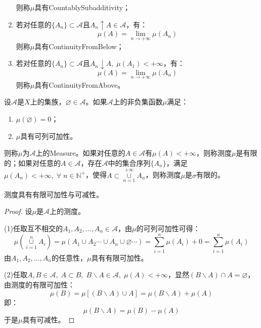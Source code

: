 \begin{definition}
\begin{enumerate}
\begin{equation*}
		\end{equation*}
		则称$\mu$具有\gls{CountablySubadditivity}；
		\item 若对任意的$\{A_n\}\subset\mathscr{A}$且$A_n\uparrow A\in\mathscr{A}$，有：
		\begin{equation*}
			\mu\left(A\right)=\lim_{n\to+\infty}\mu(A_n)
		\end{equation*}
		则称$\mu$具有\gls{ContinuityFromBelow}；
		\item 若对任意的$\{A_n\}\subset\mathscr{A}$且$A_n\downarrow A,\;\mu(A_1)<+\infty$，有：
		\begin{equation*}
			\mu\left(A\right)=\lim_{n\to+\infty}\mu(A_n)
		\end{equation*}
		则称$\mu$具有\gls{ContinuityFromAbove}。
	\end{enumerate}
\end{definition}
\begin{definition}
	设$\mathscr{A}$是$X$上的集族，$\varnothing\in\mathscr{A}$。如果$\mathscr{A}$上的非负集函数$\mu$满足：
	\begin{enumerate}
		\item $\mu(\varnothing)=0$；
		\item $\mu$具有可列可加性。
	\end{enumerate}
	则称$\mu$为$\mathscr{A}$上的\gls{Measure}。如果对任意的$A\in\mathscr{A}$有$\mu(A)<+\infty$，则称测度$\mu$是有限的；如果对任意的$A\in\mathscr{A}$，存在$\mathscr{A}$中的集合序列$\{A_n\}$，满足$\mu(A_n)<+\infty,\;\forall\;n\in\mathbb{N}^+$，使得$A\subset\underset{n=1}{\overset{+\infty}{\cup}}A_n$，则称测度$\mu$是$\sigma$有限的。
\end{definition}
\begin{theorem}\label{theo:MeasureFiniteAdditivityReducibility}
	测度具有有限可加性与可减性。
\end{theorem}
\begin{proof}
	设$\mu$是$\mathscr{A}$上的测度。\par
	(1)任取互不相交的$A_1,A_2,\dots,A_n\in\mathscr{A}$，由$\mu$的可列可加性可得：
	\begin{equation*}
		\mu\left(\underset{i=1}{\overset{n}{\cup}}A_i\right)=\mu(A_1\cup A_2\cdots\cup A_n\cup\varnothing\cdots)=\sum_{i=1}^{n}\mu(A_i)+0=\sum_{i=1}^{n}\mu(A_i)
	\end{equation*}
	由$A_1,A_2,\dots,A_n$的任意性，$\mu$具有有限可加性。\par
	(2)任取$A,B\in\mathscr{A},\;A\subset B,\;B\backslash A\in\mathscr{A},\;\mu(A)<+\infty$，显然$(B\backslash A)\cap A=\varnothing$，由测度的有限可加性：
	\begin{equation*}
		\mu(B)=\mu[(B\backslash A)\cup A]=\mu(B\backslash A)+\mu(A)
	\end{equation*}
	即：
	\begin{equation*}
		\mu(B\backslash A)=\mu(B)-\mu(A)
	\end{equation*}
	于是$\mu$具有可减性。
\end{proof}
